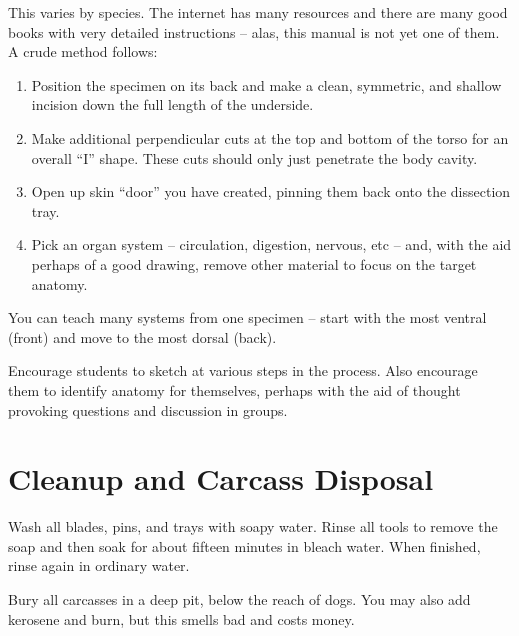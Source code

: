 This varies by species. The internet has many resources and there are many good books with very detailed instructions – alas, this manual is not yet one of them. A crude method follows:
\begin{enumerate}
\item Position the specimen on its back and make a clean, symmetric, and shallow incision down the full length of the underside. 
\item Make additional perpendicular cuts at the top and bottom of the torso for an overall “I” shape. These cuts should only just penetrate the body cavity. 
\item Open up skin ``door'' you have created, pinning them back onto the dissection tray. 
\item Pick an organ system – circulation, digestion, nervous, etc – and, with the aid perhaps of a good drawing, remove other material to focus on the target anatomy.
\end{enumerate}
You can teach many systems from one specimen – start with the most ventral (front) and move to the most dorsal (back).

Encourage students to sketch at various steps in the process. Also encourage them to identify anatomy for themselves, perhaps with the aid of thought provoking questions and discussion in groups.

\section{Cleanup and Carcass Disposal}

Wash all blades, pins, and trays with soapy water. 
Rinse all tools to remove the soap 
and then soak for about fifteen minutes in bleach water. 
When finished, rinse again in ordinary water.

Bury all carcasses in a deep pit, below the reach of dogs. 
You may also add kerosene and burn, 
but this smells bad and costs money.
